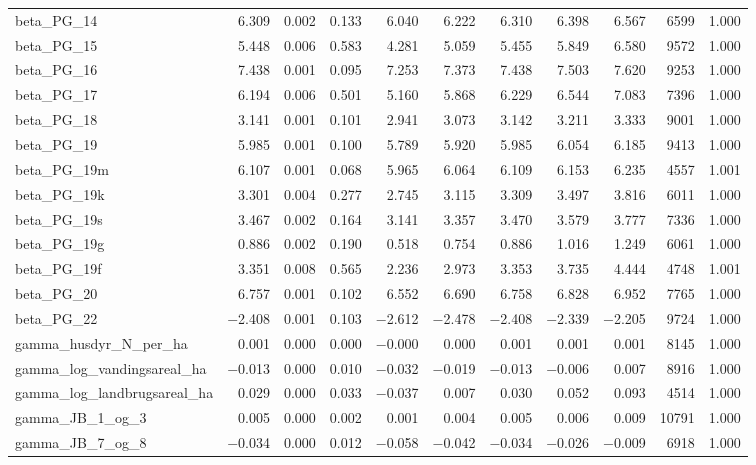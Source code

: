 \documentclass[12pt]{article}
\begin{document}
\begin{longtable}{lrrrrrrrrrr}
beta\_PG\_14  &  6.309 & 0.002 & 0.133 &  6.040 &  6.222 &  6.310 &  6.398 &  6.567 &  6599 & 1.000 \\
beta\_PG\_15  &  5.448 & 0.006 & 0.583 &  4.281 &  5.059 &  5.455 &  5.849 &  6.580 &  9572 & 1.000 \\
beta\_PG\_16  &  7.438 & 0.001 & 0.095 &  7.253 &  7.373 &  7.438 &  7.503 &  7.620 &  9253 & 1.000 \\
beta\_PG\_17  &  6.194 & 0.006 & 0.501 &  5.160 &  5.868 &  6.229 &  6.544 &  7.083 &  7396 & 1.000 \\
beta\_PG\_18  &  3.141 & 0.001 & 0.101 &  2.941 &  3.073 &  3.142 &  3.211 &  3.333 &  9001 & 1.000 \\
beta\_PG\_19  &  5.985 & 0.001 & 0.100 &  5.789 &  5.920 &  5.985 &  6.054 &  6.185 &  9413 & 1.000 \\
beta\_PG\_19m &  6.107 & 0.001 & 0.068 &  5.965 &  6.064 &  6.109 &  6.153 &  6.235 &  4557 & 1.001 \\
beta\_PG\_19k &  3.301 & 0.004 & 0.277 &  2.745 &  3.115 &  3.309 &  3.497 &  3.816 &  6011 & 1.000 \\
beta\_PG\_19s &  3.467 & 0.002 & 0.164 &  3.141 &  3.357 &  3.470 &  3.579 &  3.777 &  7336 & 1.000 \\
beta\_PG\_19g &  0.886 & 0.002 & 0.190 &  0.518 &  0.754 &  0.886 &  1.016 &  1.249 &  6061 & 1.000 \\
beta\_PG\_19f &  3.351 & 0.008 & 0.565 &  2.236 &  2.973 &  3.353 &  3.735 &  4.444 &  4748 & 1.001 \\
beta\_PG\_20  &  6.757 & 0.001 & 0.102 &  6.552 &  6.690 &  6.758 &  6.828 &  6.952 &  7765 & 1.000 \\
beta\_PG\_22  & $-$2.408 & 0.001 & 0.103 & $-$2.612 & $-$2.478 & $-$2.408 & $-$2.339 & $-$2.205 &  9724 & 1.000 \\
\addlinespace
gamma\_husdyr\_N\_per\_ha        &  0.001 & 0.000 & 0.000 & $-$0.000 &  0.000 &  0.001 &  0.001 &  0.001 &  8145 & 1.000 \\
gamma\_log\_vandingsareal\_ha   & $-$0.013 & 0.000 & 0.010 & $-$0.032 & $-$0.019 & $-$0.013 & $-$0.006 &  0.007 &  8916 & 1.000 \\
gamma\_log\_landbrugsareal\_ha  &  0.029 & 0.000 & 0.033 & $-$0.037 &  0.007 &  0.030 &  0.052 &  0.093 &  4514 & 1.000 \\
gamma\_JB\_1\_og\_3  &  0.005 & 0.000 & 0.002 &  0.001 &  0.004 &  0.005 &  0.006 &  0.009 & 10791 & 1.000 \\
gamma\_JB\_7\_og\_8  & $-$0.034 & 0.000 & 0.012 & $-$0.058 & $-$0.042 & $-$0.034 & $-$0.026 & $-$0.009 &  6918 & 1.000 \\

\end{longtable}
\end{document}
